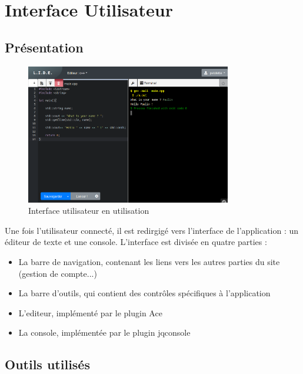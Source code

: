 \chapter{Interface Utilisateur}

\section{Présentation}

\begin{figure}[h]
  \centering
  \includegraphics[width=0.8\textwidth]{./img/frontend/example1.png}
  \caption{Interface utilisateur en utilisation}
  \label{}
\end{figure}

Une fois l'utilisateur connecté, il est redirgigé vers l'interface de l'application : un éditeur de texte et une console.
L'interface est divisée en quatre parties :
\begin{itemize}
  \item La barre de navigation, contenant les liens vers les autres parties du site (gestion de compte...)
  \item La barre d'outils, qui contient des contrôles spécifiques à l'application
  \item L'editeur, implémenté par le plugin Ace
  \item La console, implémentée par le plugin jqconsole
\end{itemize}

\section{Outils utilisés}

